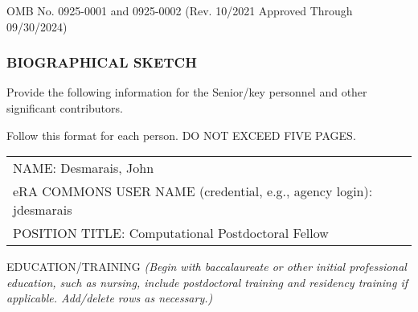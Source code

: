 \documentclass[
]{article}
\author{}
\date{}
\begin{document}
OMB No. 0925-0001 and 0925-0002 (Rev. 10/2021 Approved Through
09/30/2024)

\hypertarget{biographical-sketch}{%
\subsubsection{\texorpdfstring{\textbf{BIOGRAPHICAL
SKETCH}}{BIOGRAPHICAL SKETCH}}\label{biographical-sketch}}

Provide the following information for the Senior/key personnel and other
significant contributors.

Follow this format for each person. DO NOT EXCEED FIVE PAGES.

\begin{longtable}[]{@{}
  >{\raggedright\arraybackslash}p{}@{}}
\toprule\noalign{}
\endhead
\bottomrule\noalign{}
\endlastfoot
NAME: Desmarais, John \\
eRA COMMONS USER NAME (credential, e.g., agency login): jdesmarais \\
POSITION TITLE: Computational Postdoctoral Fellow \\
\end{longtable}

EDUCATION/TRAINING \emph{(Begin with baccalaureate or other initial
professional education, such as nursing, include postdoctoral training
and residency training if applicable. Add/delete rows as necessary.)}
\end{document}
